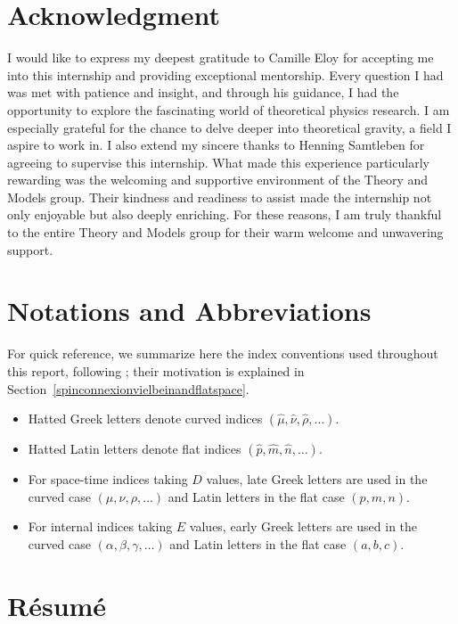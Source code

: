 \documentclass{article}
\begin{document}
\section*{Acknowledgment}
I would like to express my deepest gratitude to Camille Eloy for accepting me into this internship and providing exceptional mentorship. 
Every question I had was met with patience and insight, and through his guidance, 
I had the opportunity to explore the fascinating world of theoretical physics research. I am especially grateful for the chance to delve deeper into theoretical gravity, a field I aspire to work in.
I also extend my sincere thanks to Henning Samtleben for agreeing to supervise this internship.
What made this experience particularly rewarding was the welcoming and supportive environment of the Theory and Models group. Their kindness and readiness to assist made the internship not only enjoyable but also deeply enriching.
For these reasons, I am truly thankful to the entire Theory and Models group for their warm welcome and unwavering support.
\section*{Notations and Abbreviations}
For quick reference, we summarize here the index conventions used throughout this report, following \cite{scherk1979get}; their motivation is explained in Section~\ref{spinconnexionvielbeinandflatspace}.
\begin{itemize} \label{notation}
    \item Hatted Greek letters denote curved indices $(\hat \mu , \hat \nu , \hat \rho , \dots)$.
    \item Hatted Latin letters denote flat indices $(\hat p , \hat m , \hat n , \dots)$.
    \item For space-time indices taking $D$ values, late Greek letters are used in the curved case $(\mu, \nu ,\rho , \dots)$ and Latin letters in the flat case $(p, m, n)$.
    \item For internal indices taking $E$ values, early Greek letters are used in the curved case $(\alpha, \beta ,\gamma , \dots)$ and Latin letters in the flat case $(a,b,c)$.
\end{itemize}
\section*{Résumé}
\end{document}
